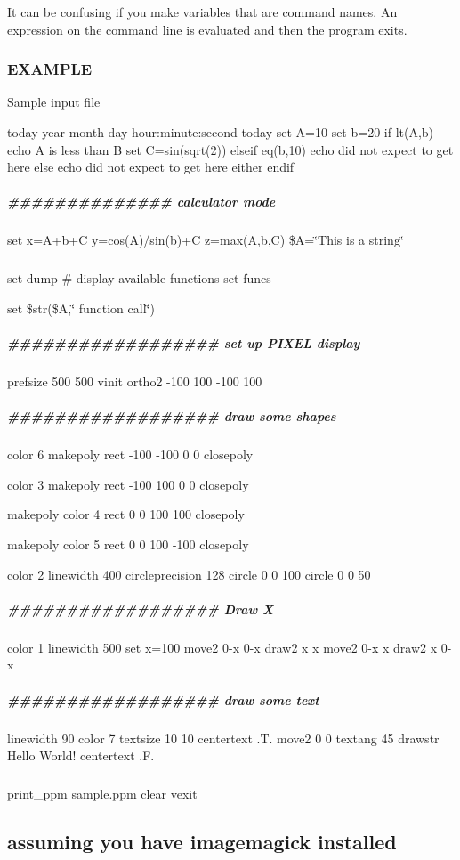 It can be confusing if you make variables that are command names. An expression on the command line is evaluated and then the program exits.

\subsubsection*{E\+X\+A\+M\+P\+LE}

Sample input file

today year-\/month-\/day hour\+:minute\+:second today set A=10 set b=20 if lt(\+A,b) echo A is less than B set C=sin(sqrt(2)) elseif eq(b,10) echo did not expect to get here else echo did not expect to get here either endif

\subparagraph*{\#\#\#\#\#\#\#\#\#\#\#\#\#\# calculator mode}

set x=A+b+C y=cos(\+A)/sin(b)+C z=max(\+A,b,\+C) \$A=\char`\"{}\+This is a string\char`\"{}\subparagraph*{}

set dump \# display available functions set funcs

set \$str(\$A,\char`\"{} function call\char`\"{}) \subparagraph*{\#\#\#\#\#\#\#\#\#\#\#\#\#\#\#\#\#\# set up P\+I\+X\+EL display}

prefsize 500 500 vinit ortho2 -\/100 100 -\/100 100 \subparagraph*{\#\#\#\#\#\#\#\#\#\#\#\#\#\#\#\#\#\# draw some shapes}

color 6 makepoly rect -\/100 -\/100 0 0 closepoly

color 3 makepoly rect -\/100 100 0 0 closepoly

makepoly color 4 rect 0 0 100 100 closepoly

makepoly color 5 rect 0 0 100 -\/100 closepoly

color 2 linewidth 400 circleprecision 128 circle 0 0 100 circle 0 0 50 \subparagraph*{\#\#\#\#\#\#\#\#\#\#\#\#\#\#\#\#\#\# Draw X}

color 1 linewidth 500 set x=100 move2 0-\/x 0-\/x draw2 x x move2 0-\/x x draw2 x 0-\/x \subparagraph*{\#\#\#\#\#\#\#\#\#\#\#\#\#\#\#\#\#\# draw some text}

linewidth 90 color 7 textsize 10 10 centertext .T. move2 0 0 textang 45 drawstr Hello World! centertext .F. \subparagraph*{}

print\+\_\+ppm sample.\+ppm clear vexit \subparagraph*{}

\subsection*{assuming you have imagemagick installed}

